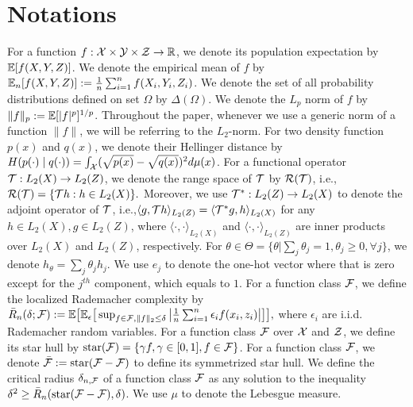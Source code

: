 \vspace{-3mm}
\section{Notations}\label{sec:notations}
\vspace{-3mm}

For a function $f: \mathcal{X} \times \mathcal{Y} \times \mathcal{Z} \rightarrow \mathbb{R}$, 
we denote its population expectation by $\mathbb{E}[f(X,Y,Z)]$. We denote the empirical mean of $f$ by $\mathbb{E}_n[f(X,Y,Z)]:= \frac{1}{n}\sum_{i=1}^n f(X_i, Y_i, Z_i)$. We denote the set of all probability distributions defined on set $\Omega$ by $\Delta(\Omega)$. We denote the $L_p$ norm of $f$ by $\|f\|_p := \mathbb{E}[|f|^p]^{1/p}$. Throughout the paper, whenever we use a generic norm of a function $\|f\|$, we will be referring to the $L_2$-norm. For two density function $p(x)$ and $q(x)$, we denote their Hellinger distance by $H(p(\cdot)\mid q(\cdot)) = \int_{\mathcal{X}} (\sqrt{p(x)} - \sqrt{q(x)})^2 d\mu(x)$. For a functional operator ${\mathcal{T}}: L_2(X) \rightarrow L_2(Z)$, we denote the range space of ${\mathcal{T}}$ by $\mathcal{R}({\mathcal{T}} )$, i.e., $\mathcal{R}({\mathcal{T}}) = \{{\mathcal{T}} h: h \in L_2(X)\}.$ Moreover, we use ${\mathcal{T}}^*: L_2(Z) \rightarrow L_2(X)$ to denote the adjoint operator of ${\mathcal{T}}$, i.e.,$\langle g, {\mathcal{T}} h\rangle_{L_2(Z)} = \langle {\mathcal{T}}^* g, h\rangle_{L_2(X)}$ 
for any $h \in L_2(X), g \in L_2(Z)$, where $\langle\cdot,\cdot\rangle_{L_2(X)}$ and
$\langle\cdot,\cdot\rangle_{L_2(Z)}$ are inner products over $L_2(X)$ and $L_2(Z)$, respectively. For $\theta\in\Theta = \{\theta | \sum_j \theta_j = 1, \theta_j\geq 0,\forall j\} $, we denote $h_{\theta} = \sum_j \theta_j h_j$. We use $e_j$ to denote the one-hot vector where that is zero except for the $j^{th}$ component, which equals to $1$. For a function class $\mathcal{F}$, we define the localized Rademacher complexity by $
\bar{R}_n (\delta; \mathcal{F}) := \mathbb{E}\big[ \mathbb{E}_\epsilon\big[\sup_{f\in \mathcal{F}, \|f\|_2 \leq \delta} \big|\frac{1}{n}\sum_{i=1}^n \epsilon_i f(x_i, z_i)\big|\big]\big],$
where $\epsilon_i$ are i.i.d. Rademacher random variables. For a function class $\mathcal{F}$ over $\mathcal{X}$ and $\mathcal{Z}$, we define its star hull by $\operatorname{star}(\mathcal{F}) = \{\gamma f, \gamma \in [0,1], f\in \mathcal{F} \}$. For a function class $\mathcal{F}$, we denote $\bar{\mathcal{F}} := \operatorname{star}(\mathcal{F} - \mathcal{F})$ to define its symmetrized star hull. We define the critical radius $\delta_{n,\mathcal{F}}$ of a function class $\mathcal{F}$ as any solution to the inequality $\delta^2 \geq \bar{R}_n(\operatorname{star}(\mathcal{F} - \mathcal{F}),\delta)$.  We use $\mu$ to denote the Lebesgue measure. 

